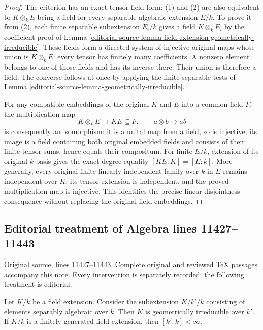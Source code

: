 \begin{proof}
The criterion has an exact
tensor-field form: (1) and (2)
are also equivalent to
$K\otimes_k E$ being a field
for every separable algebraic
extension $E/k$. To prove it
from (2), each finite separable
subextension $E_i/k$ gives a
field $K\otimes_k E_i$ by the
coefficient proof of Lemma
\ref{editorial-source-lemma-field-extension-geometrically-irreducible}.
These fields form a directed
system of injective original
maps whose union is
$K\otimes_k E$: every tensor
has finitely many coefficients.
A nonzero element belongs to
one of those fields and has
its inverse there. Their union
is therefore a field. The
converse follows at once by
applying the finite separable
tests of Lemma
\ref{editorial-source-lemma-geometrically-irreducible}.

For any compatible embeddings
of the original $K$ and $E$
into a common field $F$, the
multiplication map
$$
K\otimes_k E\longrightarrow KE\subseteq F,
\qquad a\otimes b\longmapsto ab
$$
is consequently an isomorphism:
it is a unital map from a field,
so is injective; its image is
a field containing both original
embedded fields and consists of
their finite tensor sums, hence
equals their compositum.
For finite $E/k$, extension of
its original $k$-basis gives
the exact degree equality
$[KE:K]=[E:k]$. More generally,
every original finite linearly
independent family over $k$
in $E$ remains independent
over $K$: its tensor extension
is independent, and the proved
multiplication map is injective.
This identifies the precise
linear-disjointness consequence
without replacing the original
field embeddings.
\end{proof}


\subsection{Editorial treatment of Algebra lines 11427--11443}

\hypertarget{algebra-context-147}{}

\noindent\href{https://github.com/stacks/stacks-project/blob/a04446e57ec1fbc252a871afcec7752fb2807b14/algebra.tex\#L11427}{Original source, lines 11427--11443}. Complete original and reviewed TeX passages accompany this note. Every intervention is separately recorded; the following treatment is editorial.


\begin{lemma}
\label{editorial-source-lemma-make-geometrically-irreducible}
Let $K/k$ be a field extension. Consider the subextension $K/k'/k$ consisting
of elements separably algebraic over $k$. Then $K$ is geometrically irreducible
over $k'$. If $K/k$ is a finitely generated field extension, then
$[k' : k] < \infty$.
\end{lemma}

